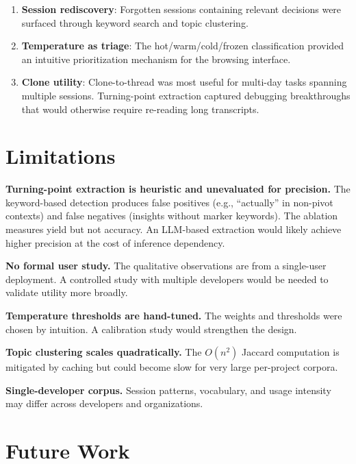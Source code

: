 \documentclass[11pt]{article}
\begin{document}
\begin{enumerate}[nosep]
  \item \textbf{Session rediscovery}: Forgotten sessions containing relevant decisions were surfaced through keyword search and topic clustering.
  \item \textbf{Temperature as triage}: The hot/warm/cold/frozen classification provided an intuitive prioritization mechanism for the browsing interface.
  \item \textbf{Clone utility}: Clone-to-thread was most useful for multi-day tasks spanning multiple sessions. Turning-point extraction captured debugging breakthroughs that would otherwise require re-reading long transcripts.
\end{enumerate}

\section{Limitations}
\label{sec:limitations}

\textbf{Turning-point extraction is heuristic and unevaluated for precision.} The keyword-based detection produces false positives (e.g., ``actually'' in non-pivot contexts) and false negatives (insights without marker keywords). The ablation measures yield but not accuracy. An LLM-based extraction would likely achieve higher precision at the cost of inference dependency.

\textbf{No formal user study.} The qualitative observations are from a single-user deployment. A controlled study with multiple developers would be needed to validate utility more broadly.

\textbf{Temperature thresholds are hand-tuned.} The weights and thresholds were chosen by intuition. A calibration study would strengthen the design.

\textbf{Topic clustering scales quadratically.} The $O(n^2)$ Jaccard computation is mitigated by caching but could become slow for very large per-project corpora.

\textbf{Single-developer corpus.} Session patterns, vocabulary, and usage intensity may differ across developers and organizations.

\section{Future Work}
\label{sec:future}
\end{document}
